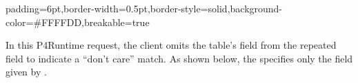 \documentclass[11pt]{article}
\begin{document}
{%
\begin{mdbmargintb}{6pt}{6pt}%
\begin{mdblock}{padding=6pt,border-width=0.5pt,border-style=solid,background-color=\#FFFFDD,breakable=true}%
\begin{mdpre}%
\end{mdpre}%
\end{mdblock}%
\end{mdbmargintb}%

\noindent{}In this P4Runtime request, the client omits the table's  field
from the repeated  field to indicate a \textquotedblleft{}don't care\textquotedblright{} match. As shown
below, the  specifies only the  field given by .%

}
\end{document}
